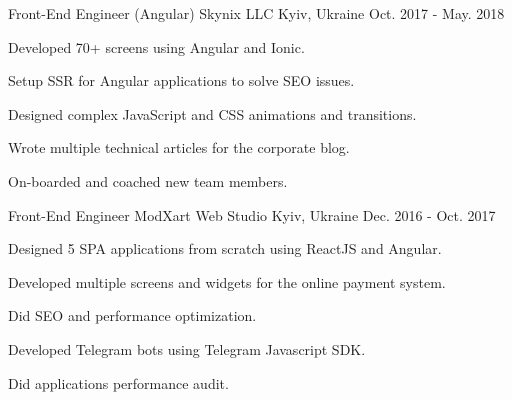\begin{cventries}
  \cventry
    {Front-End Engineer (Angular)} %
    {Skynix LLC} %
    {Kyiv, Ukraine} %
    {Oct. 2017 - May. 2018} %
    {
      \begin{cvitems} %
        \item {Developed 70+ screens using Angular and Ionic.}
        \item {Setup SSR for Angular applications to solve SEO issues.}
        \item {Designed complex JavaScript and CSS animations and transitions.}
        \item {Wrote multiple technical articles for the corporate blog.}
        \item {On-boarded and coached new team members.}
      \end{cvitems}
    }

  \cventry
    {Front-End Engineer} %
    {ModXart Web Studio} %
    {Kyiv, Ukraine} %
    {Dec. 2016 - Oct. 2017} %
    {
      \begin{cvitems} %
        \item {Designed 5 SPA applications from scratch using ReactJS and Angular.}
        \item {Developed multiple screens and widgets for the online payment system.}
        \item {Did SEO and performance optimization.}
        \item {Developed Telegram bots using Telegram Javascript SDK.}
        \item {Did applications performance audit.}
      \end{cvitems}
    }
\end{cventries}
